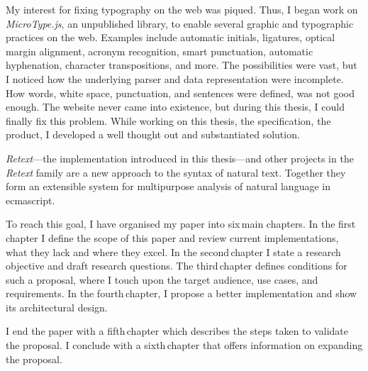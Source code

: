 My interest for fixing typography on the web was piqued.
Thus, I began work on \emph{MicroType.js}, an unpublished library, to
  enable several graphic and typographic practices on the web.
Examples include automatic initials, ligatures, optical margin alignment,
  acronym recognition, smart punctuation, automatic hyphenation, character
  transpositions, and more.
The possibilities were vast, but I noticed how the underlying parser and data
  representation were incomplete.
How words, white space, punctuation, and sentences were defined, was not
  good enough.
The website never came into existence, but during this thesis, I could
  finally fix this problem.
While working on this thesis, the specification, the product, I developed a
  well thought out and substantiated solution.

\emph{Retext}---the implementation introduced in this thesis---and other
  projects in the \emph{Retext} family are a new approach to the syntax of
  natural text.
Together they form an extensible system for multipurpose analysis of natural
  language in \gls{ecmascript}.

To reach this goal, I have organised my paper into six\,main chapters.
In the first\,chapter I define the scope of this paper and review current
  implementations, what they lack and where they excel.
In the second\,chapter I state a research objective and draft research
  questions.
The third\,chapter defines conditions for such a proposal, where I touch
  upon the target audience, use cases, and requirements.
In the fourth\,chapter, I propose a better implementation and show its
  architectural design.

I end the paper with a fifth\,chapter which describes the steps taken to
  validate the proposal.
I conclude with a sixth\,chapter that offers information on expanding the
  proposal.

\endgroup
